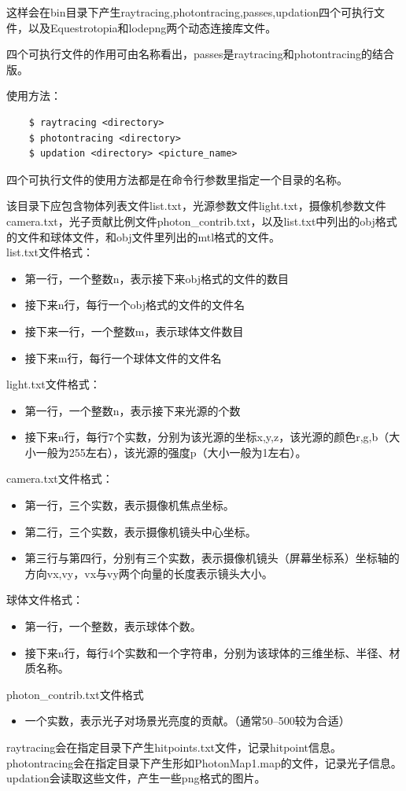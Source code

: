 \documentclass[a4paper,12pt]{article}
\theoremstyle{plain}
\numberwithin{thmdef}{section}
\begin{document}
这样会在bin目录下产生raytracing,photontracing,passes,updation四个可执行文件，以及Equestrotopia和lodepng两个动态连接库文件。\par
四个可执行文件的作用可由名称看出，passes是raytracing和photontracing的结合版。\par
使用方法：
\begin{verbatim}
    $ raytracing <directory>
    $ photontracing <directory>
    $ updation <directory> <picture_name>
\end{verbatim}
四个可执行文件的使用方法都是在命令行参数里指定一个目录的名称。\par
该目录下应包含物体列表文件list.txt，光源参数文件light.txt，摄像机参数文件camera.txt，光子贡献比例文件photon\_contrib.txt，以及list.txt中列出的obj格式的文件和球体文件，和obj文件里列出的mtl格式的文件。
\vspace{10pt}\\
list.txt文件格式：
\begin{itemize}
    \small \setlength{\itemsep}{.1em}
    \item 第一行，一个整数n，表示接下来obj格式的文件的数目
    \item 接下来n行，每行一个obj格式的文件的文件名
    \item 接下来一行，一个整数m，表示球体文件数目
    \item 接下来m行，每行一个球体文件的文件名
\end{itemize}
light.txt文件格式：
\begin{itemize}
    \small \setlength{\itemsep}{.1em}
    \item 第一行，一个整数n，表示接下来光源的个数
    \item 接下来n行，每行7个实数，分别为该光源的坐标x,y,z，该光源的颜色r,g,b（大小一般为255左右），该光源的强度p（大小一般为1左右）。
\end{itemize}
camera.txt文件格式：
\begin{itemize}
    \small \setlength{\itemsep}{.1em}
    \item 第一行，三个实数，表示摄像机焦点坐标。
    \item 第二行，三个实数，表示摄像机镜头中心坐标。
    \item 第三行与第四行，分别有三个实数，表示摄像机镜头（屏幕坐标系）坐标轴的方向vx,vy，vx与vy两个向量的长度表示镜头大小。
\end{itemize}
球体文件格式：
\begin{itemize}
    \small \setlength{\itemsep}{.1em}
    \item 第一行，一个整数，表示球体个数。
    \item 接下来n行，每行4个实数和一个字符串，分别为该球体的三维坐标、半径、材质名称。
\end{itemize}
photon\_contrib.txt文件格式
\begin{itemize}
    \small \setlength{\itemsep}{.1em}
    \item 一个实数，表示光子对场景光亮度的贡献。（通常50--500较为合适）
\end{itemize}
raytracing会在指定目录下产生hitpoints.txt文件，记录hitpoint信息。\\
photontracing会在指定目录下产生形如PhotonMap1.map的文件，记录光子信息。\\
updation会读取这些文件，产生一些png格式的图片。
\end{document}
